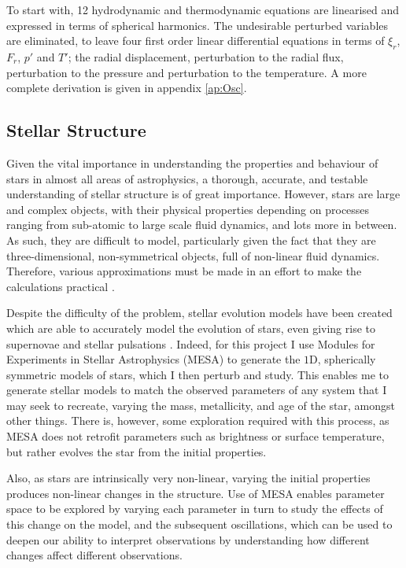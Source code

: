 \documentclass[11pt]{amsart}
\begin{document}
To start with, 12 hydrodynamic and thermodynamic equations are linearised and expressed in terms of spherical harmonics. The undesirable perturbed variables are eliminated, to leave four first order linear differential equations in terms of $\xi_{r}$, $F_{r}$, $p'$ and $T'$; the radial displacement, perturbation to the radial flux, perturbation to the pressure and perturbation to the temperature.  A more complete derivation is given in appendix \ref{ap:Osc}.





\subsection{Stellar Structure}

Given the vital importance in understanding the properties and behaviour of stars in almost all areas of astrophysics, a thorough, accurate, and testable understanding of stellar structure is of great importance.  However, stars are large and complex objects, with their physical properties depending on processes ranging from sub-atomic to large scale fluid dynamics, and lots more in between.  As such, they are difficult to model, particularly given the fact that they are three-dimensional, non-symmetrical objects, full of non-linear fluid dynamics.  Therefore, various approximations must be made in an effort to make the calculations practical \cite{Paxton2011}.

Despite the difficulty of the problem, stellar evolution models have been created which are able to accurately model the evolution of stars, even giving rise to supernovae and stellar pulsations \cite{Paxton2015}.  Indeed, for this project I use Modules for Experiments in Stellar Astrophysics (MESA) \cite{Paxton2011} to generate the $1$D, spherically symmetric models of stars, which I then perturb and study.  This enables me to generate stellar models to match the observed parameters of any system that I may seek to recreate, varying the mass, metallicity, and age of the star, amongst other things.  There is, however, some exploration required with this process, as MESA does not retrofit parameters such as brightness or surface temperature, but rather evolves the star from the initial properties.

Also, as stars are intrinsically very non-linear, varying the initial properties produces non-linear changes in the structure.  Use of MESA enables parameter space to be explored by varying each parameter in turn to study the effects of this change on the model, and the subsequent oscillations, which can be used to deepen our ability to interpret observations by understanding how different changes affect different observations.
\end{document}
